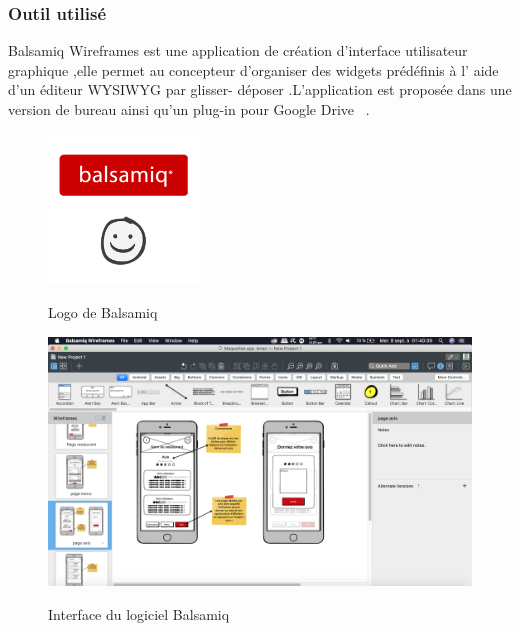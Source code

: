 \subsubsection{Outil utilisé}
Balsamiq Wireframes est une application de création d'interface 
utilisateur graphique ,elle permet au concepteur d'organiser des 
widgets prédéfinis à l' aide d'un éditeur WYSIWYG par glisser-
déposer .L'application est proposée dans une version de bureau 
ainsi qu'un plug-in pour Google Drive ~\cite{Balsamiq2020}.
\begin{figure}[!h]

    \centering
    \includegraphics[width=4cm]{images/Chapitre3/balmockups.png}
    \label{fig:logobalsamiq}
    \caption{Logo de Balsamiq}
\end{figure}
\begin{figure}[!h]

    \centering
    \includegraphics[width=6in]{images/Chapitre3/interface_balsamiq.png}
    \label{fig:interfacebalsamiq}
    \caption{Interface du logiciel Balsamiq}
\end{figure}
\newpage
